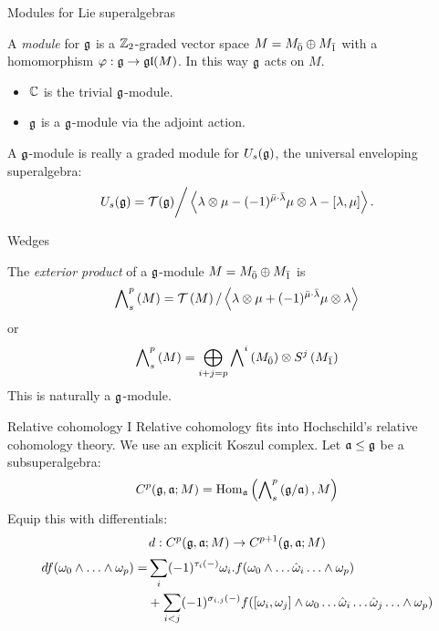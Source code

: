\documentclass{beamer}
\begin{document}
\begin{frame}{Modules for Lie superalgebras}\pause
  \begin{definition}
    A \emph{module} for $\mathfrak{g}$ is a $\mathbb{Z}_2$-graded vector space $M = {M}_{\bar{0}} \oplus {M}_{\bar{1}}$ with a homomorphism $\varphi: \mathfrak{g} \to \mathfrak{gl}(M)$. In this way $\mathfrak{g}$ acts on $M$.
  \end{definition}\pause
  \begin{example}
    \begin{itemize}
    \item $\mathbb{C}$ is the trivial $\mathfrak{g}$-module.\pause
    \item $\mathfrak{g}$ is a $\mathfrak{g}$-module via the adjoint action.
    \end{itemize}
    
  \end{example}\pause
  A $\mathfrak{g}$-module is really a graded module for $U_s(\mathfrak{g})$, the universal enveloping superalgebra:
  \[
    U_s(\mathfrak{g}) = \mathcal{T}(\mathfrak{g}) \bigg/ \left< \lambda \otimes \mu - (-1)^{\bar \mu \cdot \bar \lambda} \mu \otimes \lambda  - [\lambda, \mu]\right>.
  \]
\end{frame}

\begin{frame}{Wedges}\pause
  \begin{definition}
    The \emph{exterior product} of a $\mathfrak{g}$-module $M = {M}_{\bar{0}} \oplus {M}_{\bar{1}}$ is
    \[
      \bigwedge\nolimits^{p}_s\left(M\right) = \mathcal{T}\left(M\right)/\left< \lambda \otimes \mu + (-1)^{\bar \mu \cdot \bar \lambda} \mu \otimes \lambda \right>
    \]\pause
    or
    \[
      \bigwedge\nolimits^{p}_s\left(M\right) = \bigoplus_{i+j=p} \bigwedge\nolimits^{i}\left({M}_{\bar{0}}\right) \otimes {S}^j\left({M}_{\bar{1}}\right)
    \]\pause
 This is naturally a $\mathfrak{g}$-module.   
  \end{definition}
\end{frame}

\begin{frame}{Relative cohomology I}\pause
  Relative cohomology fits into Hochschild's relative cohomology theory. \pause We use an explicit Koszul complex. \pause Let $\mathfrak{a} \leq \mathfrak{g}$ be a subsuperalgebra:
  \[
    C^p(\mathfrak{g},\mathfrak{a};M) = \operatorname{Hom}_{\mathfrak{a}}\left(\bigwedge\nolimits^{p}_s\left( \mathfrak{g}/\mathfrak{a} \right), M \right)
  \]\pause
  Equip this with differentials:
  \[
    d: C^{p}(\mathfrak{g},\mathfrak{a};M) \to C^{p+1}(\mathfrak{g},\mathfrak{a};M)
  \]\pause
  \begin{align*}
    df(\omega_0\wedge\ldots\wedge\omega_p) = &\sum_i (-1)^{\tau_i(-)} \omega_i . f(\omega_0 \wedge \ldots \hat {\omega}_i \ldots \wedge \omega_p) \\
    &+ \sum_{i < j} (-1)^{\sigma_{i,j}(-)} f([\omega_i,\omega_j]\wedge \omega_0 \ldots \hat {\omega}_i \ldots \hat {\omega}_j \ldots \wedge \omega_p)
  \end{align*}
\end{frame}
\end{document}
